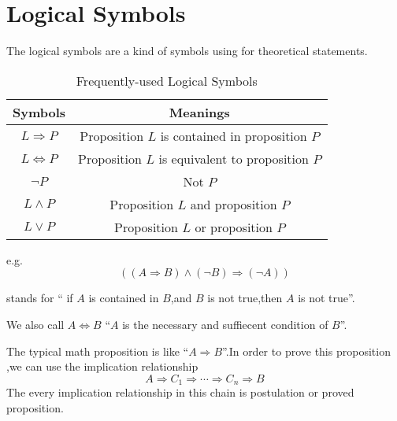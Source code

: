 \section{Logical Symbols}
The logical symbols are a kind of symbols using for theoretical statements.
    \begin{table}[H]
        \centering
        \caption{Frequently-used Logical Symbols}
        \begin{tabular}{|c|c|}\hline
            Symbols&Meanings\\\hline
            $L\Longrightarrow P$& Proposition $L$ is contained in proposition $P$\\
            $L \Longleftrightarrow P $&Proposition $L$ is equivalent to proposition $P$\\
            $\lnot P$&Not $P$\\
            $L\wedge P$&Proposition $L$ and proposition $P$\\
            $L \vee P$&Proposition $L$ or proposition $P$\\
            \hline
        \end{tabular}
    \end{table}
e.g.\[((A\Longrightarrow B)\wedge(\lnot B)\Longrightarrow (\lnot A) )\]


stands for `` if $A$ is contained in  $B$,and $B$ is not true,then $A$ is not true''.

We also call $ A \Longleftrightarrow B$ ``$A$ is the necessary and suffiecent condition of $B$''.

The typical math proposition is like ``$A\Longrightarrow B$''.In order to prove this proposition ,we can use the  implication relationship \[A\Longrightarrow C_1\Longrightarrow \cdots \Longrightarrow C_n\Longrightarrow B\]The every implication relationship in this chain is postulation or proved proposition.

